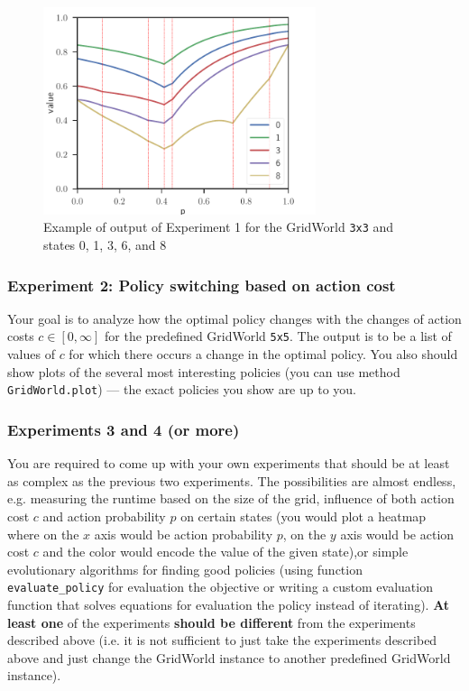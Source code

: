 \documentclass[10pt,journal,compsoc,twoside]{IEEEtran}
\begin{document}
\begin{figure}[t]
    \includegraphics[width=8cm]{figures/experiment_1_3x3.pdf}
    \centering
    \caption{Example of output of Experiment 1 for the GridWorld \texttt{3x3} and states 0, 1, 3, 6, and 8}
    \label{fig:experiment_1_3x3}
\end{figure}


\subsubsection{Experiment 2: Policy switching based on action cost}
Your goal is to analyze how the optimal policy changes with the changes of action costs $c \in [0,\infty]$ for the predefined GridWorld \texttt{5x5}. The output is to be a list of values of $c$ for which there occurs a change in the optimal policy. You also should show plots of the several most interesting policies (you can use method \lstinline{GridWorld.plot}) --- the exact policies you show are up to you.

\subsubsection{Experiments 3 and 4 (or more)}
You are required to come up with your own experiments that should be at least as complex as the previous two experiments. The possibilities are almost endless, e.g. measuring the runtime based on the size of the grid, influence of both action cost $c$ and action probability $p$ on certain states (you would plot a heatmap where on the $x$ axis would be action probability $p$, on the $y$ axis would be action cost $c$ and the color would encode the value of the given state),or simple evolutionary algorithms for finding good policies (using function \lstinline{evaluate_policy} for evaluation the objective or writing a custom evaluation function that solves equations for evaluation the policy instead of iterating). \textbf{At least one} of the experiments \textbf{should be different} from the experiments described above (i.e. it is not sufficient to just take the experiments described above and just change the GridWorld instance to another predefined GridWorld instance).
\end{document}
